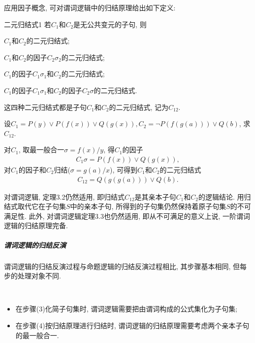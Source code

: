 应用因子概念, 可对谓词逻辑中的归结原理给出如下定义:
\begin{mydef}{二元归结式}{1}
若$C_1$和$C_2$是无公共变元的子句, 则

\quad   {} $C_1$和$C_2$的二元归结式;

\quad   {}  $C_1$和$C_2$的因子$C_2 \sigma_2$的二元归结式;

\quad   {}  $C_1$的因子$C_1\sigma_1$和$C_2$的二元归结式;

\quad   {} $C_1$的因子$C_1\sigma_1$和$C_2$的因子$C_2 \sigma$的二元归结式.

这四种二元归结式都是子句$C_1$和$C_2$的二元归结式, 记为$C_{12}$.
\end{mydef}
\begin{example}
    设$C_1=P(y)\vee P(f(x))\vee Q(g(x)), C_2 =\neg P(f(g(a)))\vee Q(b)$, 求$C_{12}$.
\end{example}
\begin{result}
    对$C_1$, 取最一般合一$\sigma ={f(x)/y}$, 得$C_1$的因子
\begin{align}
    C_1\sigma =P(f(x))\vee Q(g(x)),
\end{align}
对$C_1$的因子和$C_2$归结($\sigma={g(a)/x }$), 可得到$C_1$和$C_2$的二元归结式
\begin{align}
    C_{12}=Q(g(g(a)))\vee Q(b).
\end{align}
\end{result}
\begin{remark}
    对谓词逻辑, 定理3.2仍然适用, 即归结式$C_{12}$是其亲本子句$C_1$和$C_2$的逻辑结论. 用归结式取代它在子句集$S$中的亲本子句, 所得到的子句集仍然保持着原子句集$S$的不可满足性.
此外, 对谓词逻辑定理3.3也仍然适用, 即从不可满足的意义上说, 一阶谓词逻辑的归结原理完备.
\end{remark}
\subparagraph{谓词逻辑的归结反演}
谓词逻辑的归结反演过程与命题逻辑的归结反演过程相比, 其步骤基本相同, 但每步的处理对象不同.
\begin{example}~{}
	
\begin{itemize}
    \item 在步骤(3)化简子句集时, 谓词逻辑需要把由谓词构成的公式集化为子句集;
    \item 在步骤(4)按归结原理进行归结时, 谓词逻辑的归结原理需要考虑两个亲本子句的最一般合一.
\end{itemize}
\end{example}

